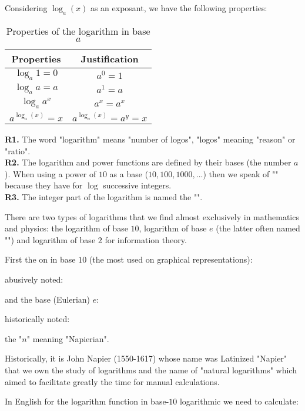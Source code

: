 	
	Considering $\log_a(x)$ as an exposant, we have the following properties:	
	\begin{table}[H]
	\begin{center}
		\begin{tabular}{|c|c|}
			  \hline
			  \rowcolor[gray]{0.75}Properties & Justification \\ \hline
			  $\log_a1=0$ & $a^0=1$ \\ \hline
			  $\log_aa=a$ & $a^1=a$ \\ \hline
			  $\log_aa^x$ & $a^x=a^x$ \\ \hline
			  $a^{\log_a(x)}=x$ & $a^{\log_a(x)}=a^y=x$ \\
			  \hline
		\end{tabular}
		\end{center}
		\caption{Properties of the logarithm in base $a$}
	\end{table}
	\begin{tcolorbox}[title=Remarks,colframe=black,arc=10pt]
	\textbf{R1.} The word "logarithm" means "number of logos", "logos" meaning "reason" or "ratio".\\
	
	\textbf{R2.} The logarithm and power functions are defined by their bases (the number $a$). When using a power of $10$ as a base ($10, 100, 1000, ...$) then we speak of "" because they have for $\log$ successive integers.\\
	
	\textbf{R3.} The integer part of the logarithm is named the "".
	\end{tcolorbox}
	There are two types of logarithms that we find almost exclusively in mathematics and physics: the logarithm of base $10$, logarithm of base $e$ (the latter often named "") and logarithm of base $2$ for information theory.
	
	First the on in base $10$ (the most used on graphical representations):
	
	abusively noted:
	
	and the base (Eulerian) $e$:
	
	historically noted:
	
	the "$n$" meaning "Napierian".
	
	\begin{tcolorbox}[title=Remark,colframe=black,arc=10pt]
	Historically, it is John Napier (1550-1617) whose name was Latinized "Napier" that we own the study of logarithms and the name of "natural logarithms" which aimed to facilitate greatly the time for manual calculations.
	\end{tcolorbox}
	In English for the logarithm function in base-$10$ logarithmic we need to calculate:
	
